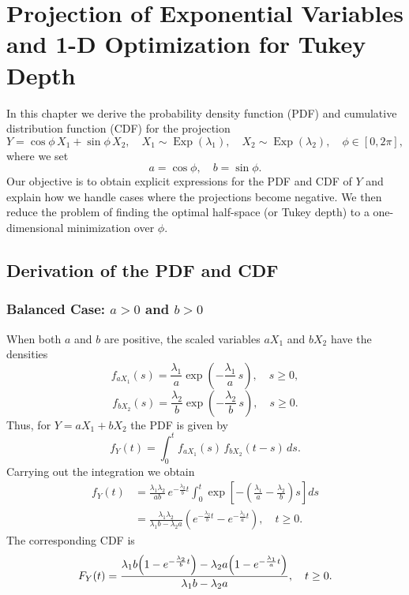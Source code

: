 \chapter{Projection of Exponential Variables and 1-D Optimization for Tukey Depth}

In this chapter we derive the probability density function (PDF) and cumulative distribution function (CDF) for the projection
\[
Y = \cos\phi\,X_1+\sin\phi\,X_2,\quad X_1\sim\operatorname{Exp}(\lambda_1),\quad X_2\sim\operatorname{Exp}(\lambda_2),\quad \phi\in[0,2\pi],
\]
where we set
\[
a=\cos\phi,\quad b=\sin\phi.
\]
Our objective is to obtain explicit expressions for the PDF and CDF of \(Y\) and explain how we handle cases where the projections become negative. We then reduce the problem of finding the optimal half-space (or Tukey depth) to a one-dimensional minimization over \(\phi\).

\section{Derivation of the PDF and CDF}

\subsection{Balanced Case: \(a>0\) and \(b>0\)}
When both \(a\) and \(b\) are positive, the scaled variables \(aX_1\) and \(bX_2\) have the densities
\[
f_{aX_1}(s)=\frac{\lambda_1}{a}\exp\left(-\frac{\lambda_1}{a}\,s\right),\quad s\ge0,
\]
\[
f_{bX_2}(s)=\frac{\lambda_2}{b}\exp\left(-\frac{\lambda_2}{b}\,s\right),\quad s\ge0.
\]
Thus, for \(Y=aX_1+bX_2\) the PDF is given by
\[
f_Y(t)=\int_0^t f_{aX_1}(s)\,f_{bX_2}(t-s)\,ds.
\]
Carrying out the integration we obtain
\[
\begin{aligned}
f_Y(t) &= \frac{\lambda_1\lambda_2}{ab}\,e^{-\frac{\lambda_2}{b}t}\int_0^t \exp\left[-\left(\frac{\lambda_1}{a}-\frac{\lambda_2}{b}\right)s\right]ds\\[1mm]
&=\frac{\lambda_1\lambda_2}{\lambda_1b-\lambda_2a}\left(e^{-\frac{\lambda_2}{b}t}-e^{-\frac{\lambda_1}{a}t}\right),\quad t\ge0.
\end{aligned}
\]
The corresponding CDF is
\[
F_Y(t)=\frac{\lambda_1b\Bigl(1-e^{-\frac{\lambda_2}{b}t}\Bigr)-\lambda_2a\Bigl(1-e^{-\frac{\lambda_1}{a}t}\Bigr)}{\lambda_1b-\lambda_2a},\quad t\ge0.
\]

